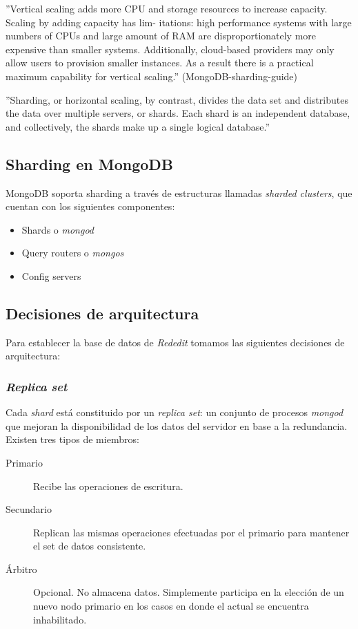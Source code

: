 ''Vertical scaling adds more CPU and storage resources to increase capacity. Scaling by adding capacity has lim-
itations: high performance systems with large numbers of CPUs and large amount of RAM are disproportionately
more expensive than smaller systems. Additionally, cloud-based providers may only allow users to provision smaller
instances. As a result there is a practical maximum capability for vertical scaling.'' (MongoDB-sharding-guide)

''Sharding, or horizontal scaling, by contrast, divides the data set and distributes the data over multiple servers, or
shards. Each shard is an independent database, and collectively, the shards make up a single logical database.''

\subsection{Sharding en MongoDB}

MongoDB soporta sharding a través de estructuras llamadas \emph{sharded clusters},
que cuentan con los siguientes componentes:

\begin{itemize}
	\item Shards o \emph{mongod}
	\item Query routers o \emph{mongos}
	\item Config servers 
\end{itemize}


\subsection{Decisiones de arquitectura}

Para establecer la base de datos de \emph{Rededit} tomamos las siguientes decisiones de arquitectura:

\subsubsection{\emph{Replica set}}

Cada \emph{shard} está constituido por un \emph{replica set}: un conjunto de procesos \emph{mongod} que mejoran la 
disponibilidad de los datos del
servidor en base a la redundancia. Existen tres tipos de miembros:

\begin{description}
	\item[Primario] Recibe las operaciones de escritura.
	\item[Secundario] Replican las mismas operaciones efectuadas por el primario para mantener el set de datos consistente.
	\item[Árbitro] Opcional. 
	No almacena datos. Simplemente participa en la elección de un nuevo nodo primario en los casos en donde el actual se
	encuentra inhabilitado.
\end{description}

